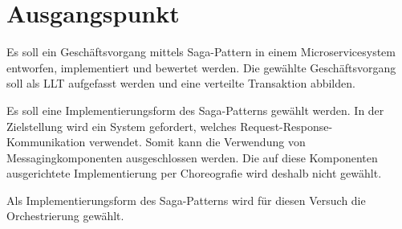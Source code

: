 \section{Ausgangspunkt}

Es soll ein Geschäftsvorgang mittels Saga-Pattern in einem Microservicesystem entworfen, implementiert und bewertet werden. Die gewählte Geschäftsvorgang soll als LLT aufgefasst werden und eine verteilte Transaktion abbilden. 

Es soll eine Implementierungsform des Saga-Patterns gewählt werden. In der Zielstellung wird ein System gefordert, welches Request-Response-Kommunikation verwendet. Somit kann die Verwendung von Messagingkomponenten ausgeschlossen werden. Die auf diese Komponenten ausgerichtete Implementierung per Choreografie wird deshalb nicht gewählt. 

Als Implementierungsform des Saga-Patterns wird für diesen Versuch die Orchestrierung gewählt. 






